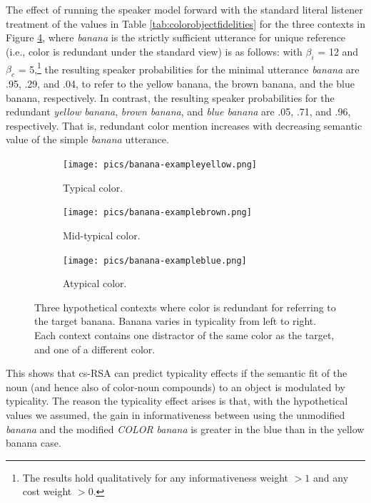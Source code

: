 \documentclass[11pt]{article}
\newcommand{\tableref}[1]{Table \ref{#1}}
\newcommand{\figref}[1]{Figure \ref{#1}}
\begin{document}
The effect of running the speaker model forward with the standard literal listener treatment of the values in \tableref{tab:colorobjectfidelities} for the three contexts in \figref{fig:bananaexamples}, where \emph{banana} is the strictly sufficient utterance for unique reference (i.e., color is redundant under the standard view) is as follows:  with $\beta_i$ = 12 and $\beta_c$ = 5,\footnote{The results hold qualitatively for any informativeness weight $> 1$ and any cost weight $> 0$.} the resulting speaker probabilities for the minimal utterance \emph{banana} are .95, .29, and .04, to refer to the yellow banana, the brown banana, and the blue banana, respectively. In contrast, the resulting speaker probabilities for the redundant \emph{yellow banana}, \emph{brown banana}, and \emph{blue banana} are .05, .71, and .96, respectively. That is, redundant color mention increases with decreasing semantic value of the simple \emph{banana} utterance. 

\begin{figure}[bt!]
	\begin{subfigure}{.33\textwidth}
		\centering
		\texttt{[image: pics/banana-exampleyellow.png]}
		\caption{Typical color.}
		\label{fig:bananayellow}
	\end{subfigure}
	\begin{subfigure}{.33\textwidth}
		\centering
		\texttt{[image: pics/banana-examplebrown.png]}
		\centering
		\caption{Mid-typical color.}
		\label{fig:bananabrown}
	\end{subfigure}
	\begin{subfigure}{.33\textwidth}
		\centering
		\texttt{[image: pics/banana-exampleblue.png]}
		\caption{Atypical color.}
		\label{fig:bananablue}
	\end{subfigure}
	\caption{Three hypothetical contexts where color is redundant for referring to the target banana. Banana varies in typicality from left to right. Each context contains one distractor of the same color as the target, and one of a different color.}
	\label{fig:bananaexamples}
\end{figure}

This shows that cs-RSA can predict typicality effects if the semantic fit of the noun (and hence also of color-noun compounds) to an object is modulated by typicality. The reason the typicality effect arises is that, with the hypothetical values we assumed, the gain in informativeness between using the unmodified \emph{banana} and the modified \emph{COLOR banana} is greater in the blue than in the yellow banana case. 
\end{document}

